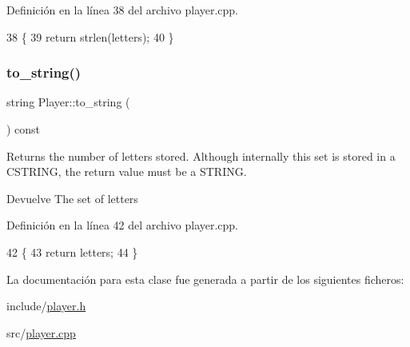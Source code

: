 Definición en la línea 38 del archivo player.\+cpp.


\begin{DoxyCode}
38                        \{
39     \textcolor{keywordflow}{return} strlen(letters);
40 \}
\end{DoxyCode}
\mbox{\label{classPlayer_af069ef7e0afaead3c21ac3af4d3c9c40}} 
\subsubsection{\texorpdfstring{to\+\_\+string()}{to\_string()}}
{\footnotesize\ttfamily string Player\+::to\+\_\+string (\begin{DoxyParamCaption}{ }\end{DoxyParamCaption}) const}



Returns the number of letters stored. Although internally this set is stored in a C\+S\+T\+R\+I\+NG, the return value must be a S\+T\+R\+I\+NG. 

\begin{DoxyReturn}{Devuelve}
The set of letters 
\end{DoxyReturn}


Definición en la línea 42 del archivo player.\+cpp.


\begin{DoxyCode}
42                                \{
43     \textcolor{keywordflow}{return} letters;
44 \}
\end{DoxyCode}


La documentación para esta clase fue generada a partir de los siguientes ficheros\+:\begin{DoxyCompactItemize}
\item 
include/\hyperlink{player_8h}{player.\+h}\item 
src/\hyperlink{player_8cpp}{player.\+cpp}\end{DoxyCompactItemize}
